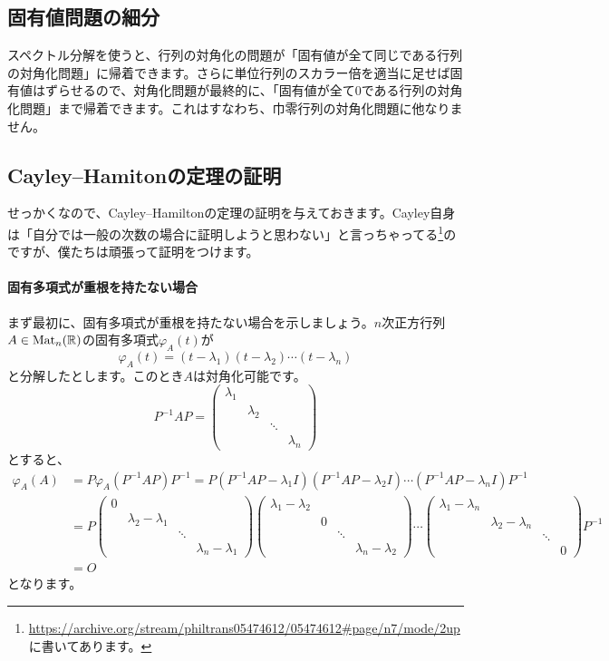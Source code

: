 \subsection{固有値問題の細分}

スペクトル分解を使うと、行列の対角化の問題が「固有値が全て同じである行列の対角化問題」に帰着できます。さらに単位行列のスカラー倍を適当に足せば固有値はずらせるので、対角化問題が最終的に、「固有値が全て$0$である行列の対角化問題」まで帰着できます。これはすなわち、巾零行列の対角化問題に他なりません。

\subsection{Cayley--Hamitonの定理の証明}

せっかくなので、Cayley--Hamiltonの定理の証明を与えておきます。Cayley自身は「自分では一般の次数の場合に証明しようと思わない」と言っちゃってる\footnote{\url{https://archive.org/stream/philtrans05474612/05474612\#page/n7/mode/2up}に書いてあります。}のですが、僕たちは頑張って証明をつけます。

\paragraph{固有多項式が重根を持たない場合}

まず最初に、固有多項式が重根を持たない場合を示しましょう。$n$次正方行列$A \in \operatorname{Mat}_n(\mathbb{R})$の固有多項式$\varphi_A(t)$が
\[
\varphi_A(t) = (t - \lambda_1) (t - \lambda_2) \cdots (t - \lambda_n)
\]
と分解したとします。このとき$A$は対角化可能です。
\[
P^{-1} A P = 
\begin{pmatrix}
\lambda_1 \\
& \lambda_2 \\
& & \ddots \\
& & & \lambda_n
\end{pmatrix}
\]
とすると、
\begin{align*}
\varphi_A(A) &= P \varphi_A(P^{-1} A P ) P^{-1}
= P (P^{-1} A P - \lambda_1 I) (P^{-1} A P - \lambda_2 I) \cdots (P^{-1} A P - \lambda_n I) P^{-1} \\
&= 
P 
\begin{pmatrix}
0 \\
& \lambda_2 - \lambda_1 \\
& & \ddots \\
& & & \lambda_n - \lambda_1
\end{pmatrix}
\begin{pmatrix}
\lambda_1 - \lambda_2 \\
& 0 \\
& & \ddots \\
& & & \lambda_n - \lambda_2
\end{pmatrix}
\cdots
\begin{pmatrix}
\lambda_1 - \lambda_n \\
& \lambda_2 - \lambda_n \\
& & \ddots \\
& & & 0
\end{pmatrix}
P^{-1} \\
&= O
\end{align*}
となります。

